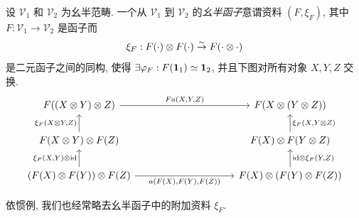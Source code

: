 \begin{definition}\label{def:monoidal-functor}
	设 $\mathcal{V}_1$ 和 $\mathcal{V}_2$ 为幺半范畴. 一个从 $\mathcal{V}_1$ 到 $\mathcal{V}_2$ 的\emph{幺半函子}意谓资料 $(F, \xi_F)$, 其中 $F: \mathcal{V}_1 \to \mathcal{V}_2$ 是函子而
	\[ \xi_F:  F(\cdot) \otimes F(\cdot) \stackrel{\sim}{\rightarrow} F(\cdot \otimes \cdot) \]
	是二元函子之间的同构, 使得 $\exists \varphi_F: F(\mathbf{1}_1) \simeq \mathbf{1}_2$, 并且下图对所有对象 $X,Y,Z$ 交换.
	\[ \begin{tikzcd}[column sep=10em]
		F((X \otimes Y) \otimes Z) \arrow[r, "{F a(X,Y,Z)}"] & F(X \otimes (Y \otimes Z)) \\
		F(X \otimes Y) \otimes F(Z) \arrow[u, "{\xi_F(X \otimes Y, Z)}"] & F(X) \otimes F(Y \otimes Z) \arrow[u, "{\xi_F(X, Y \otimes Z)}"'] \\
		(F(X) \otimes F(Y)) \otimes F(Z) \arrow[r, "{a(F(X), F(Y), F(Z))}"'] \arrow[u, "{\xi_F(X, Y) \otimes \identity}"] & F(X) \otimes (F(Y) \otimes F(Z)) \arrow[u, "{\identity \otimes \xi_F(Y, Z)}"']
	\end{tikzcd} \]
\end{definition}
依惯例, 我们也经常略去幺半函子中的附加资料 $\xi_F$.

